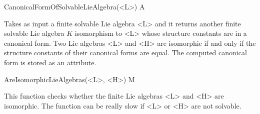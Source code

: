 \> CanonicalFormOfSolvableLieAlgebra(<L>) A

Takes as input a finite solvable Lie algebra <L> and it returns another 
finite solvable Lie algebra $K$ isomorphism to <L> whose structure 
constants are in a canonical form. Two Lie algebras <L> and <H> are 
isomorphic if and only if the structure constants of their canonical 
forms are equal. The computed canonical form is stored as an attribute.

\> AreIsomorphicLieAlgebras(<L>, <H>) M

This function checks whether the finite Lie algebras <L> and <H> are
isomorphic. The function can be really slow if <L> or <H> are not
solvable.


